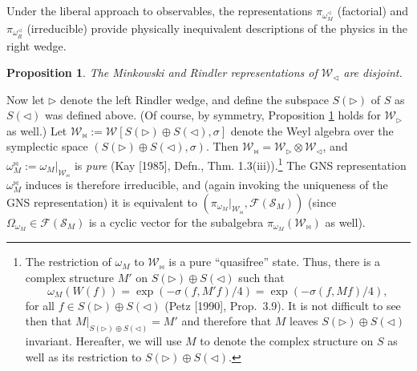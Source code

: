\documentclass[12pt]{article}
\newtheorem{prop}{Proposition}
\theoremstyle{remark}
\theoremstyle{definition}
\newcommand{\alg}[1]{\mathcal{#1}}
\newcommand{\hil}[1]{\mathcal{#1}}
\begin{document}
Under the liberal approach to observables, the representations 
$\pi_{\omega _{M}^{\triangleleft}}$ (factorial) and 
$\pi_{\omega _{R}^{\triangleleft}}$ (irreducible) provide physically 
inequivalent descriptions of the physics in the right wedge.  

\begin{prop} \label{disjoint1} The Minkowski and Rindler representations of
  $\alg{W}_{\triangleleft}$ are disjoint.  \end{prop}
  
Now let $\triangleright$ denote the left Rindler wedge, and define the
subspace $S(\triangleright)$ of $S$ as $S(\triangleleft)$ was defined
above.  (Of course, by symmetry, Proposition \ref{disjoint1} holds for
$\alg{W}_{\triangleright}$ as well.)  Let
$\alg{W}_{\bowtie}:=\alg{W}[S(\triangleright)\oplus
S(\triangleleft),\sigma ]$ denote the Weyl algebra over the symplectic
space $(S(\triangleright)\oplus S(\triangleleft),\sigma )$.  Then
$\alg{W}_{\bowtie}=\alg{W}_{\triangleright}\otimes
\alg{W}_{\triangleleft}$, and $\omega _{M}^{\bowtie} :=\omega
_{M}|_{\alg{W}_{\bowtie}}$ is \emph{pure} (Kay [1985], Defn., Thm.
1.3(iii)).\footnote{The restriction of $\omega _{M}$ to
  $\alg{W}_{\bowtie}$ is a pure ``quasifree'' state.  Thus, there is a
  complex structure $M'$ on $S(\triangleright)\oplus S(\triangleleft)$
  such that \begin{equation} \omega _{M}(W(f))=\exp (-\sigma
    (f,M'f)/4) =\exp (-\sigma (f,Mf)/4 ) ,\end{equation} for all $f\in
  S(\triangleright)\oplus S(\triangleleft)$ (Petz [1990], Prop.~3.9).
  It is not difficult to see then that $M|_{S(\triangleright)\oplus
    S(\triangleleft)}=M'$ and therefore that $M$ leaves
  $S(\triangleright)\oplus S(\triangleleft)$ invariant.  Hereafter, we
  will use $M$ to denote the complex structure on $S$ as well as its
  restriction to $S(\triangleright)\oplus S(\triangleleft)$.}  The GNS
representation $\omega _{M}^{\bowtie}$ induces is therefore
irreducible, and (again invoking the uniqueness of the GNS
representation) it is equivalent to
$(\pi_{\omega_{M}}|_{\alg{W}_{\bowtie}},\hil{F}(\hil{S}_{M}))$ (since
$\Omega _{\omega _{M}}\in\hil{F}(\hil{S}_{M})$ is a cyclic vector for
the subalgebra $\pi _{\omega _{M}}(\alg{W}_{\bowtie})$ as well).
\end{document}
